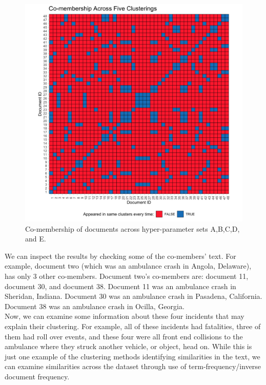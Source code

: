 \begin{figure}
\includegraphics[width=6in]{Content/Images/comembers5.png}
\caption{Co-membership of documents across hyper-parameter sets A,B,C,D, and E.}
\end{figure}

We can inspect the results by checking some of the co-members' text. For example, document two (which was an ambulance crash in Angola, Delaware), has only 3 other co-members. Document two's co-members are: document 11, document 30, and document 38. Document 11 was an ambulance crash in Sheridan, Indiana. Document 30 was an ambulance crash in Pasadena, California. Document 38 was an ambulance crash in Ocilla, Georgia.\\
Now, we can examine some information about these four incidents that may explain their clustering. For example, all of these incidents had fatalities, three of them had roll over events, and these four were all front end collisions to the ambulance where they struck another vehicle, or object, head on. While this is just one example of the clustering methods identifying similarities in the text, we can examine similarities across the dataset through use of term-frequency/inverse document frequency.\\


